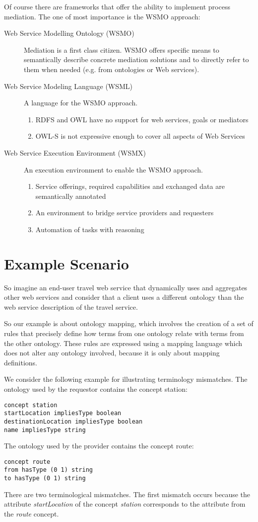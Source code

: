 \documentclass[a4paper]{article}
\begin{document}
Of course there are frameworks that offer the ability to implement process mediation. 
The one of most importance is the WSMO approach:
\begin{description}
	\item[Web Service Modelling Ontology (WSMO)] Mediation is a first class citizen.
		WSMO offers specific means to semantically describe concrete mediation 
		solutions and to directly refer to them when needed (e.g. from ontologies or Web services).
	\item[Web Service Modeling Language (WSML)] A language for the WSMO approach.
		\begin{enumerate}
			\item RDFS and OWL have no support for web services, goals or mediators
			\item OWL-S is not expressive enough to cover all aspects of Web Services
		\end{enumerate}
	\item[Web Service Execution Environment (WSMX)] An execution environment to enable the WSMO approach.
		\begin{enumerate}
			\item Service offerings, required capabilities and exchanged data are semantically annotated
			\item An environment to bridge service providers and requesters
			\item Automation of tasks with reasoning
		\end{enumerate}
\end{description}

\section{Example Scenario}

So imagine an end-user travel web service that dynamically uses and
aggregates other web services and consider that a client uses a different ontology than
the web service description of the travel service.

So our example is about ontology mapping, 
which involves the creation of a set of rules that
precisely define how terms from one ontology
relate with terms from the other ontology.
These rules are expressed using a mapping language
which does not alter any ontology involved, 
because it is only about mapping definitions.

We consider the following example for illustrating terminology mismatches.
The ontology used by the requestor contains the concept station: 
\begin{lstlisting}
concept station
startLocation impliesType boolean
destinationLocation impliesType boolean
name impliesType string
\end{lstlisting}
The ontology used by the provider contains the concept route:
\begin{lstlisting}
concept route
from hasType (0 1) string
to hasType (0 1) string
\end{lstlisting}
There are two terminological mismatches. 
The first mismatch occurs because the attribute {\em startLocation}
of the concept {\em station} corresponds to the attribute from the {\em route} concept.
\end{document}
